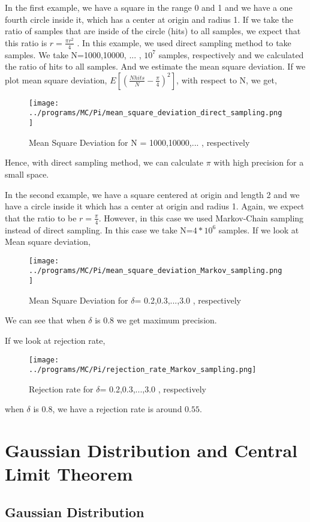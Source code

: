 \documentclass[12pt,fleqn]{report}
\begin{document}
In the first example, we have a square in the range 0 and 1 and we have a one fourth circle inside it, which has a center at origin and radius 1. If we take the ratio of samples that are inside of the circle (hits) to all samples, we expect that this ratio is $ r= \frac{\pi r^2}{4}$  . In this example, we used direct sampling method to take samples. We take N=1000,10000, ... , $10^7$ samples, respectively and we calculated the ratio of hits to all samples. And we estimate the mean square deviation. If we plot mean square deviation, $E[(\frac{Nhits}{N} - \frac{\pi}{4})^2]$, with respect to N, we get,

\begin{figure}[ht!]
\centering
\texttt{[image: ../programs/MC/Pi/mean\_square\_deviation\_direct\_sampling.png]}
\caption{Mean Square Deviation for N = 1000,10000,... , respectively}
\end{figure}
Hence, with direct sampling method, we can calculate $\pi$ with high precision for a small space. 

In the second example, we have a square centered at origin and length 2 and we have a circle inside it which has a center at origin and radius 1. Again, we expect that the ratio to be $r= \frac{\pi}{4}$. However, in this case we used Markov-Chain sampling instead of direct sampling. In this case we take N=$4*10^6$ samples. If we look at Mean square deviation, 
\begin{figure}[ht!]
\centering
\texttt{[image: ../programs/MC/Pi/mean\_square\_deviation\_Markov\_sampling.png]}
\caption{Mean Square Deviation for $\delta$= 0.2,0.3,...,3.0 , respectively}
\end{figure}
We can see that when $\delta$ is 0.8 we get maximum precision. 

If we look at rejection rate, 

\begin{figure}[ht!]
\centering
\texttt{[image: ../programs/MC/Pi/rejection\_rate\_Markov\_sampling.png]}
\caption{Rejection rate for $\delta$= 0.2,0.3,...,3.0 , respectively}
\end{figure}
when $\delta$ is 0.8, we have a rejection rate is around $0.55$.

\section{Gaussian Distribution and Central Limit Theorem}

\subsection{Gaussian Distribution}
\end{document}
